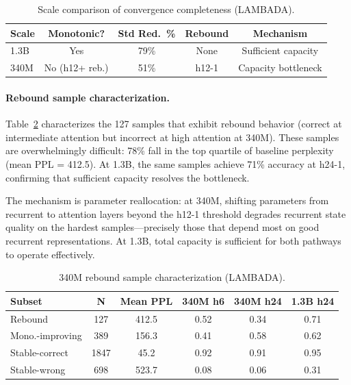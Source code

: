 \documentclass[11pt,a4paper]{article}
\begin{document}
\begin{table}[t]
\centering
\small
\caption{Scale comparison of convergence completeness (LAMBADA).}
\label{tab:scale-comparison}
\begin{tabular}{lcccc}
\toprule
\textbf{Scale} & \textbf{Monotonic?} & \textbf{Std Red.\ \%} & \textbf{Rebound} & \textbf{Mechanism} \\
\midrule
1.3B & Yes              & 79\% & None   & Sufficient capacity \\
340M & No (h12+ reb.)   & 51\% & h12-1  & Capacity bottleneck \\
\bottomrule
\end{tabular}
\end{table}

\paragraph{Rebound sample characterization.}
Table~\ref{tab:rebound-samples} characterizes the 127 samples that exhibit rebound behavior (correct at intermediate attention but incorrect at high attention at 340M).
These samples are overwhelmingly difficult: 78\% fall in the top quartile of baseline perplexity (mean PPL = 412.5).
At 1.3B, the same samples achieve 71\% accuracy at h24-1, confirming that sufficient capacity resolves the bottleneck.

The mechanism is parameter reallocation: at 340M, shifting parameters from recurrent to attention layers beyond the h12-1 threshold degrades recurrent state quality on the hardest samples---precisely those that depend most on good recurrent representations.
At 1.3B, total capacity is sufficient for both pathways to operate effectively.

\begin{table}[t]
\centering
\small
\caption{340M rebound sample characterization (LAMBADA).}
\label{tab:rebound-samples}
\begin{tabular}{lccccc}
\toprule
\textbf{Subset} & \textbf{N} & \textbf{Mean PPL} & \textbf{340M h6} & \textbf{340M h24} & \textbf{1.3B h24} \\
\midrule
Rebound         & 127  & 412.5 & 0.52 & 0.34 & 0.71 \\
Mono.-improving & 389  & 156.3 & 0.41 & 0.58 & 0.62 \\
Stable-correct  & 1847 & 45.2  & 0.92 & 0.91 & 0.95 \\
Stable-wrong    & 698  & 523.7 & 0.08 & 0.06 & 0.31 \\
\bottomrule
\end{tabular}
\end{table}
\end{document}
